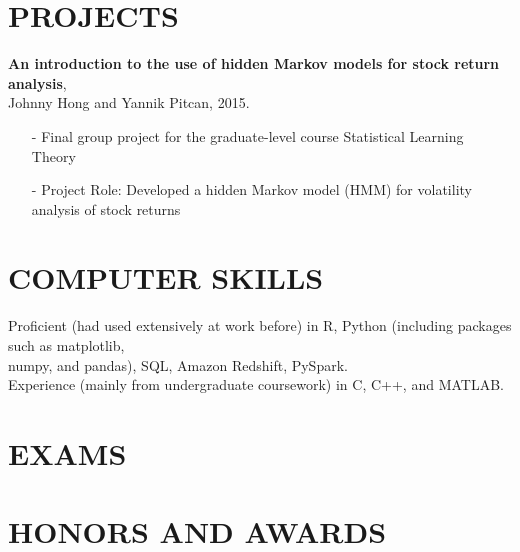 \documentclass{res}
\begin{document}
\begin{resume}
\section{PROJECTS}
\textbf{An introduction to the use of hidden Markov models for stock return analysis}, \\Johnny Hong and Yannik Pitcan, 2015.
            \begin{itemize}\setlength\itemsep{0em}
            \item[-] Final group project for the graduate-level course Statistical Learning Theory
            \item[-] Project Role: Developed a hidden Markov model (HMM) for volatility analysis of stock returns
            \end{itemize}
            
\section{COMPUTER SKILLS}          
    Proficient (had used extensively at work before) in R, Python (including packages such as matplotlib, \\numpy, and pandas), SQL, Amazon Redshift, PySpark. \\
    Experience (mainly from undergraduate coursework) in C, C++, and MATLAB. \\

\section{EXAMS}
 
\section{HONORS AND AWARDS}        
    \\
     \\
     \\
    \\
     \\
 

\end{resume}
\end{document}

